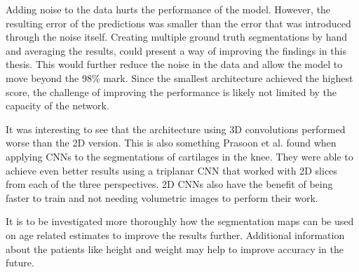 Adding noise to the data hurts the performance of the model. However, the resulting error of the predictions was smaller than the error that was introduced through the noise itself. Creating multiple ground truth segmentations by hand and averaging the results, could present a way of improving the findings in this thesis. This would further reduce the noise in the data and allow the model to move beyond the 98\% mark. Since the smallest architecture achieved the highest score, the challenge of improving the performance is likely not limited by the capacity of the network.

 It was interesting to see that the architecture using 3D convolutions performed worse than the 2D version. This is also something Prasoon et al. \cite{Prasoon2013} found when applying CNNs to the segmentations of cartilages in the knee. They were able to achieve even better results using a triplanar CNN that worked with 2D slices from each of the three perspectives. 2D CNNs also have the benefit of being faster to train and not needing volumetric images to perform their work.

It is to be investigated more thoroughly how the segmentation maps can be used on age related estimates to improve the results further. Additional information about the patients like height and weight may help to improve accuracy in the future.

\newpage